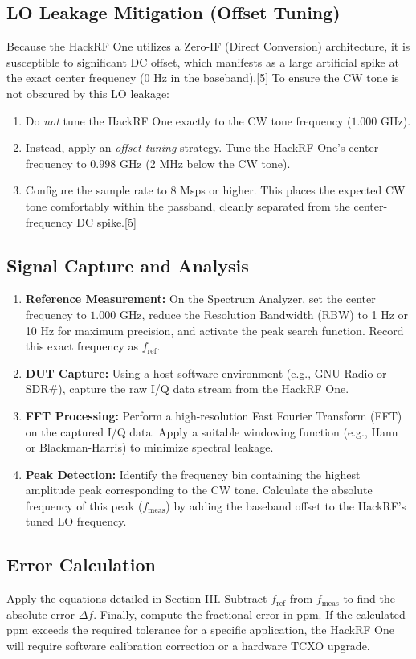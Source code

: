 \documentclass[journal, a4paper]{IEEEtran}
\begin{document}
\subsection{LO Leakage Mitigation (Offset Tuning)}
Because the HackRF One utilizes a Zero-IF (Direct Conversion) architecture, it is susceptible to significant DC offset, which manifests as a large artificial spike at the exact center frequency (0 Hz in the baseband).[5] To ensure the CW tone is not obscured by this LO leakage:
\begin{enumerate}
    \item Do \textit{not} tune the HackRF One exactly to the CW tone frequency ($1.000$ GHz). 
    \item Instead, apply an \textit{offset tuning} strategy. Tune the HackRF One's center frequency to $0.998$ GHz (2 MHz below the CW tone).
    \item Configure the sample rate to $8$ Msps or higher. This places the expected CW tone comfortably within the passband, cleanly separated from the center-frequency DC spike.[5]
\end{enumerate}

\subsection{Signal Capture and Analysis}
\begin{enumerate}
    \item \textbf{Reference Measurement:} On the Spectrum Analyzer, set the center frequency to $1.000$ GHz, reduce the Resolution Bandwidth (RBW) to 1 Hz or 10 Hz for maximum precision, and activate the peak search function. Record this exact frequency as $f_{\text{ref}}$.
    \item \textbf{DUT Capture:} Using a host software environment (e.g., GNU Radio or SDR\#), capture the raw I/Q data stream from the HackRF One.
    \item \textbf{FFT Processing:} Perform a high-resolution Fast Fourier Transform (FFT) on the captured I/Q data. Apply a suitable windowing function (e.g., Hann or Blackman-Harris) to minimize spectral leakage.
    \item \textbf{Peak Detection:} Identify the frequency bin containing the highest amplitude peak corresponding to the CW tone. Calculate the absolute frequency of this peak ($f_{\text{meas}}$) by adding the baseband offset to the HackRF's tuned LO frequency.
\end{enumerate}

\subsection{Error Calculation}
Apply the equations detailed in Section III. Subtract $f_{\text{ref}}$ from $f_{\text{meas}}$ to find the absolute error $\Delta f$. Finally, compute the fractional error in ppm. If the calculated ppm exceeds the required tolerance for a specific application, the HackRF One will require software calibration correction or a hardware TCXO upgrade.
\end{document}
